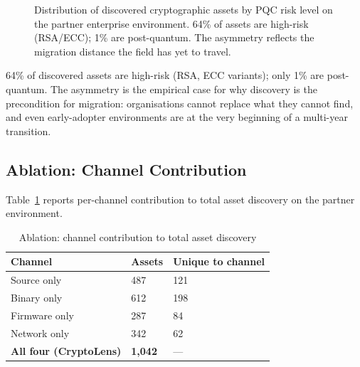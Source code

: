 \documentclass[sigconf,nonacm]{acmart}
\begin{document}
\begin{figure}[h]
\centering
{}
\caption{Distribution of discovered cryptographic assets by PQC
  risk level on the partner enterprise environment. 64\% of assets
  are high-risk (RSA/ECC); 1\% are post-quantum. The asymmetry
  reflects the migration distance the field has yet to travel.}
\label{fig:risk}
\end{figure}

64\% of discovered assets are high-risk (RSA, ECC variants); only
1\% are post-quantum. The asymmetry is the empirical case for
why discovery is the precondition for migration: organisations
cannot replace what they cannot find, and even early-adopter
environments are at the very beginning of a multi-year
transition.

\subsection{Ablation: Channel Contribution}

Table~\ref{tab:ablation} reports per-channel contribution to total
asset discovery on the partner environment.

\begin{table}[h]
\caption{Ablation: channel contribution to total asset discovery}
\label{tab:ablation}
\small
\begin{tabularx}{\columnwidth}{@{}p{2.6cm}X X@{}}
\toprule
\textbf{Channel} & \textbf{Assets} & \textbf{Unique to channel} \\
\midrule
Source only        & 487 & 121 \\
Binary only        & 612 & 198 \\
Firmware only      & 287 &  84 \\
Network only       & 342 &  62 \\
\midrule
\textbf{All four (CryptoLens)} & \textbf{1{,}042} & --- \\
\bottomrule
\end{tabularx}
\end{table}
\end{document}
